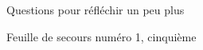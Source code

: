 
\begin{feuilleExo}{Questions pour réfléchir un peu plus}
\end{feuilleExo}

\begin{feuilleExo}{Feuille de secours numéro 1, cinquième}
\end{feuilleExo}

